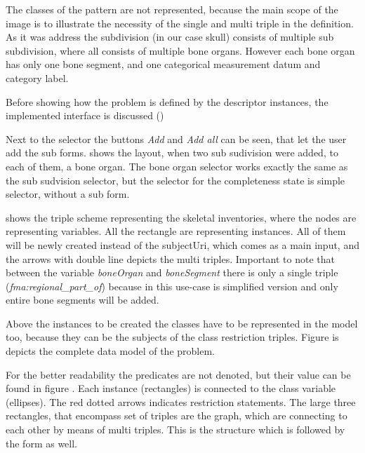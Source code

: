 
The classes of the pattern are not represented, because the main scope of the image is to illustrate the necessity of the single and multi triple in the definition. As it was address the subdivision (in our case skull) consists of multiple sub subdivision, where all consists of multiple bone organs. However each bone organ has only one bone segment, and one categorical measurement datum and category label.

Before showing how the problem is defined by the descriptor instances, the implemented interface is discussed () 




Next to the selector the buttons \textit{Add} and \textit{Add all} can be seen, that let the user add the sub forms.  shows the layout, when two sub sudivision were added, to each of them, a bone organ. The bone organ selector works exactly the same as the sub sudvision selector, but the selector for the completeness state is simple selector, without a sub form. 

 shows the triple scheme representing the skeletal inventories, where the nodes are representing variables. All the rectangle are representing instances. All of them will be newly created instead of the subjectUri, which comes as a main input, and the arrows with double line depicts the multi triples. Important to note that between the variable \textit{boneOrgan} and \textit{boneSegment} there is only a single triple (\textit{fma:regional\_part\_of}) because in this use-case is simplified version and only entire bone segments will be added. 



Above the instances to be created the classes have to be represented in the model too, because they can be the subjects of the class restriction triples.
 Figure  is depicts the complete data model of the problem.


For the better readability the predicates are not denoted, but their value can be found in figure . Each instance (rectangles) is connected to the class variable (ellipses). The red dotted arrows indicates restriction statements. The large three rectangles, that encompass set of triples are the graph, which are connecting to each other by means of multi triples. This is the structure which is followed by the form as well.

